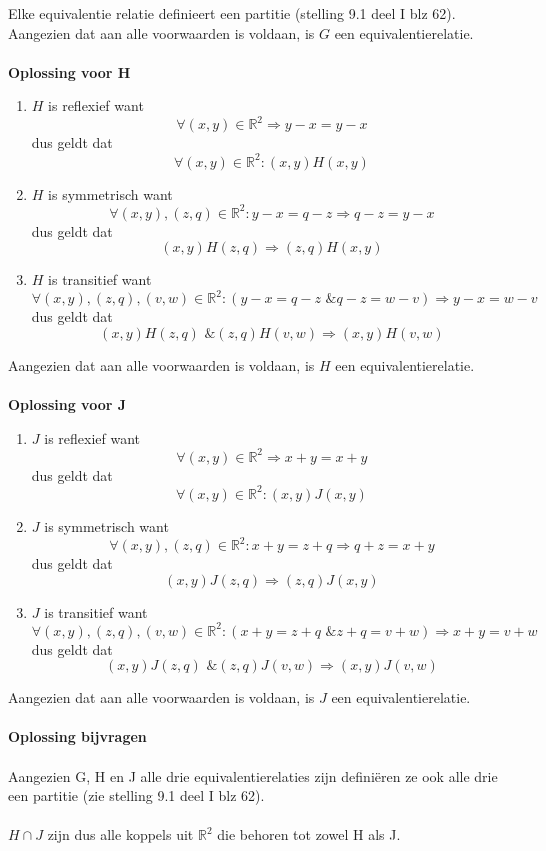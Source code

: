 \documentclass[11pt,a4paper,titlepage]{article}
\begin{document}
Elke equivalentie relatie definieert een partitie (stelling 9.1 deel I blz 62).
Aangezien dat aan alle voorwaarden is voldaan, is $G$ een equivalentierelatie.\\ \\
\textbf{Oplossing voor H}
\begin{enumerate}
\item $H$ is reflexief want
	$$ \forall (x,y) \in\mathbb{R}^2  \Rightarrow y-x = y-x$$
	dus geldt dat 
	$$ \forall (x,y) \in\mathbb{R}^2 : (x,y)H(x,y)$$
\item $H$ is symmetrisch want
	$$ \forall (x,y), (z,q) \in\mathbb{R}^2: y-x=q-z \Rightarrow  q-z=y-x $$
	dus geldt dat 
	$$ (x,y)H(z,q) \Rightarrow (z,q)H(x,y) $$
\item $H$ is transitief want
	$$ \forall (x,y), (z,q),(v,w) \in\mathbb{R}^2: (y-x=q-z \text{ \& } q-z=w-v)  \Rightarrow  y-x=w-v $$
	dus geldt dat
	$$ (x,y)H(z,q) \text{ \& } (z,q)H(v,w)  \Rightarrow (x,y)H(v,w) $$
\end{enumerate}
Aangezien dat aan alle voorwaarden is voldaan, is $H$ een equivalentierelatie.\\ \\
\textbf{Oplossing voor J}
\begin{enumerate}
\item $J$ is reflexief want
	$$ \forall (x,y) \in\mathbb{R}^2  \Rightarrow x+y=x+y$$
	dus geldt dat 
	$$ \forall (x,y) \in\mathbb{R}^2 : (x,y)J(x,y)$$
\item $J$ is symmetrisch want
	$$ \forall (x,y), (z,q) \in\mathbb{R}^2: x+y=z+q \Rightarrow  q+z=x+y $$
	dus geldt dat 
	$$ (x,y)J(z,q) \Rightarrow (z,q)J(x,y) $$
\item $J$ is transitief want
	$$ \forall (x,y), (z,q),(v,w) \in\mathbb{R}^2: (x+y=z+q\text{ \& } z+q=v+w)  \Rightarrow  x+y=v+w $$
	dus geldt dat
	$$ (x,y)J(z,q) \text{ \& } (z,q)J(v,w)  \Rightarrow (x,y)J(v,w) $$
\end{enumerate}
Aangezien dat aan alle voorwaarden is voldaan, is $J$ een equivalentierelatie.\\ \\
\textbf{Oplossing bijvragen} \\  \\
Aangezien G, H en J alle drie equivalentierelaties zijn definiëren ze ook alle drie een partitie (zie stelling 9.1 deel I blz 62). \\ \\
$H \cap J$ zijn dus alle koppels uit $\mathbb{R}^2 $ die behoren tot zowel H als J.\\
\end{document}
